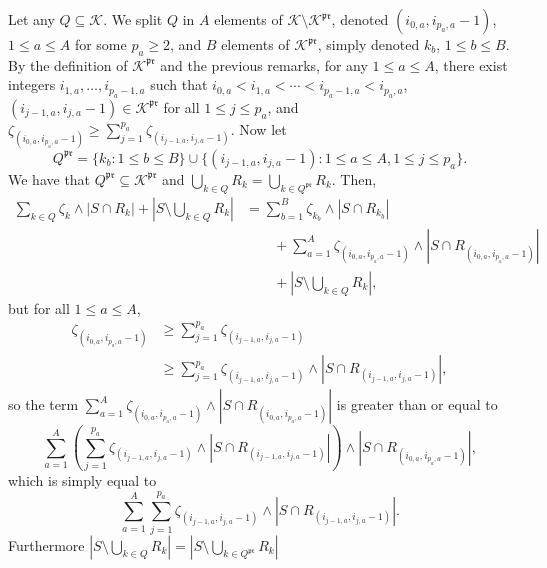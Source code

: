 \documentclass[
  11pt,
  a4paper,
]{article}
\theoremstyle{definition}
\theoremstyle{plain}
\theoremstyle{plain}
\theoremstyle{plain}
\theoremstyle{definition}
\theoremstyle{remark}
\begin{document}
Let any \(Q\subseteq \mathcal{K}\). We split \(Q\) in \(A\) elements of
\(\mathcal{K}\setminus\mathcal{K}^{\mathfrak{pr}}\), denoted
\((i_{0,a}, i_{p_a,a}-1)\), \(1\leq a\leq A\) for some \(p_a\geq2\), and
\(B\) elements of \(\mathcal{K}^{\mathfrak{pr}}\), simply denoted
\(k_b\), \(1\leq b\leq B\). By the definition of
\(\mathcal{K}^{\mathfrak{pr}}\) and the previous remarks, for any
\(1\leq a \leq A\), there exist integers \(i_{1,a},\dotsc,i_{p_a-1,a}\)
such that \(i_{0,a}<i_{1,a}<\dotsb<i_{p_a-1,a} < i_{p_a,a}\),
\((i_{j-1,a},i_{j,a}-1)\in\mathcal{K}^{\mathfrak{pr}}\) for all
\(1\leq j\leq p_a\), and
\(\zeta_{(i_{0,a}, i_{p_a,a}-1)}\geq \sum_{j=1}^{p_a}\zeta_{(i_{j-1,a},i_{j,a}-1)}\).
Now let \begin{equation}
Q^{\mathfrak{pr}}=\{k_b : 1\leq b\leq B \} \cup \{ (i_{j-1,a},i_{j,a}-1) :  1\leq a\leq A, 1\leq j\leq p_a  \}.
\label{eq_Qpr}
\end{equation} We have that
\(Q^{\mathfrak{pr}}\subseteq \mathcal{K}^{\mathfrak{pr}}\) and
\(\bigcup_{k\in Q}R_k=\bigcup_{k\in Q^{\mathfrak{pr}}}R_k\). Then,
\begin{align*}
\sum_{k\in Q}\zeta_k\wedge|S\cap R_k|+\left| S\setminus\bigcup_{k\in Q} R_k   \right|&=\sum_{b=1}^B\zeta_{k_b}\wedge|S\cap R_{k_b}| \\
&\qquad+\sum_{a=1}^A\zeta_{(i_{0,a}, i_{p_a,a}-1)}\wedge |S\cap R_{(i_{0,a}, i_{p_a,a}-1)}| \\
&\qquad+ \left| S\setminus\bigcup_{k\in Q} R_k   \right|    , 
\end{align*} but for all \(1\leq a\leq A\), \begin{align*}
\zeta_{(i_{0,a}, i_{p_a,a}-1)}&\geq  \sum_{j=1}^{p_a}\zeta_{(i_{j-1,a},i_{j,a}-1)} \\
&\geq   \sum_{j=1}^{p_a}\zeta_{(i_{j-1,a},i_{j,a}-1)} \wedge |S\cap R_{(i_{j-1,a}, i_{j,a}-1)}| ,
\end{align*} so the term
\(\sum_{a=1}^A\zeta_{(i_{0,a}, i_{p_a,a}-1)}\wedge |S\cap R_{(i_{0,a}, i_{p_a,a}-1)}|\)
is greater than or equal to \begin{equation*}
\sum_{a=1}^A\left(  \sum_{j=1}^{p_a}\zeta_{(i_{j-1,a},i_{j,a}-1)} \wedge |S\cap R_{(i_{j-1,a}, i_{j,a}-1)}| \right)\wedge |S\cap R_{(i_{0,a}, i_{p_a,a}-1)}| ,
\end{equation*} which is simply equal to \begin{equation*}
 \sum_{a=1}^A  \sum_{j=1}^{p_a}\zeta_{(i_{j-1,a},i_{j,a}-1)} \wedge |S\cap R_{(i_{j-1,a}, i_{j,a}-1)}|.
\end{equation*} Furthermore
\(\left|S\setminus\bigcup_{k\in Q} R_k\right|= \left|S\setminus\bigcup_{k\in Q^{\mathfrak{pr}}} R_k\right|\)
\end{document}
